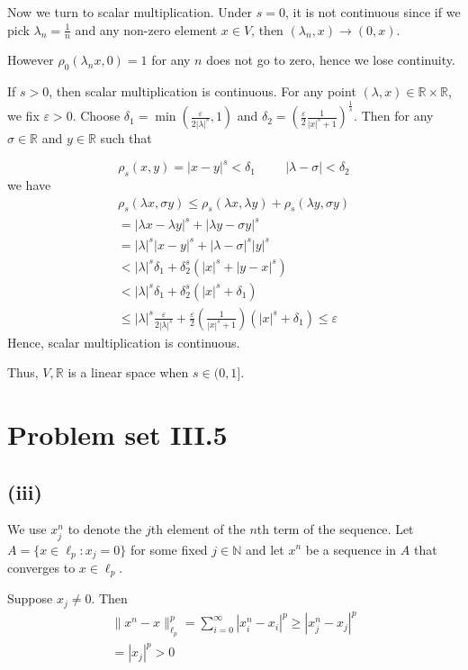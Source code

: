 \documentclass{article}
\numberwithin{equation}{section}
\theoremstyle{definition}
\newcommand{\R}{\mathbb{R}}
\newcommand{\eps}{\varepsilon}
\newcommand{\set}[1]{\{#1\}}
\begin{document}
Now we turn to scalar multiplication. Under $s=0$, it is not continuous since if we pick $\lambda_n = \frac 1n$ and any non-zero element $x \in V$, then $(\lambda_n, x) \to (0, x)$.

However $\rho_0(\lambda_n x, 0) = 1$ for any $n$ does not go to zero, hence we lose continuity.

If $s>0$, then scalar multiplication is continuous. For any point $(\lambda, x) \in \R \times \R$, we fix $\eps > 0$. Choose $\delta_1 = \min \left(\frac{\eps}{2|\lambda|^s},1\right)$ and $\delta_2 = \left(\frac{\eps}{2}\frac{1}{|x|^s + 1}\right)^{\frac{1}{s}}$. Then for any $\sigma \in \R$ and $y \in \R$ such that

\begin{equation}
    \rho_s(x,y) = | x- y|^s < \delta_1 \hspace{1cm}  |\lambda-\sigma| < \delta_2
\end{equation}
we have
\begin{align}
    \rho_s(\lambda x, \sigma y) \leq \rho_s(\lambda x, \lambda y) + \rho_s(\lambda y, \sigma y) \\
    = |\lambda x-\lambda y|^s + |\lambda y-\sigma y|^s \\
    = |\lambda|^s| x- y|^s + |\lambda-\sigma |^s |y|^s \\
    < |\lambda|^s \delta_1 + \delta_2 ^ s (|x|^s + |y-x|^s) \\
    < |\lambda|^s \delta_1 + \delta_2 ^ s (|x|^s + \delta_1) \\
    \leq |\lambda|^s \frac{\eps}{2|\lambda|^s} + \frac{\eps}{2}\left(\frac{1}{|x|^s + 1}\right)(|x|^s + \delta_1) \leq \eps
\end{align}
Hence, scalar multiplication is continuous.

Thus, $V, \R$ is a linear space when $s \in (0,1]$.

\section{Problem set III.5}
\subsection{(iii)}
We use $x_j^n$ to denote the $j$th element of the $n$th term of the sequence.
Let $A = \set{x \in \ell_p : x_j = 0}$ for some fixed $j \in \mathbb{N}$ and let $x^n$ be a sequence in $A$ that converges to $x \in \ell_p$. 

Suppose $x_j \neq 0$. Then
\begin{align}
    \|x^n - x\|_{\ell_p}^p = \sum_{i=0}^{\infty} |x_i^n - x_i|^p \geq |x_j^n - x_j|^p \\
    =  |x_j|^p > 0
\end{align}
\end{document}
